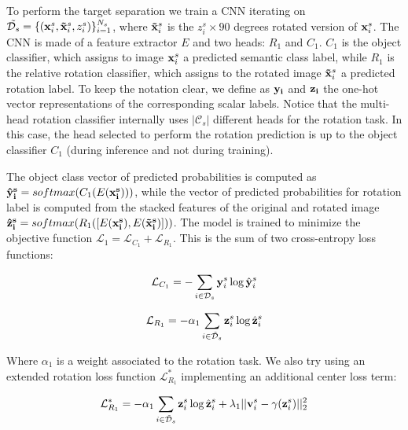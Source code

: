 \documentclass[10pt,twocolumn,letterpaper]{article}
\begin{document}
To perform the target separation we train a CNN iterating on $\tilde{\mathcal{D}_s} = \{({\bf x}_i^s, {\bf \tilde x}_i^s, z_i^s)\}_{i=1}^{N_s}$,
where ${\bf \tilde x}_i^s$ is the $z_i^s\times 90$ degrees rotated version of ${\bf x}_i^s$.
The CNN is made of a feature extractor $E$ and two heads: $R_1$ and $C_1$.
$C_1$ is the object classifier, which assigns to image ${\bf x}_i^s$ a predicted semantic class label,
while $R_1$ is the relative rotation classifier, which assigns to the rotated image ${\bf \tilde x}_i^s$ a predicted rotation label.
To keep the notation clear, we define as ${\bf y_i}$ and ${\bf z_i}$ the one-hot vector representations of the corresponding scalar labels.
Notice that the multi-head rotation classifier internally uses $|\mathcal{C}_s|$ different heads for the rotation task.
In this case, the head selected to perform the rotation prediction is up to the object classifier $C_1$ (during inference and not during training). 

The object class vector of predicted probabilities is computed as ${\bf \hat{y}_i^s} = softmax(C_1(E({\bf x_i^s})))$, while the vector of predicted probabilities
for rotation label is computed from the stacked features of the original and rotated image ${\bf \hat{z}_i^s} = softmax(R_1([E({\bf x_i^s}), E({\bf \tilde{x}_i^s})]))$.
The model is trained to minimize the objective function $\mathcal{L}_1 = \mathcal{L}_{C_1} + \mathcal{L}_{R_1}$.
This is the sum of two cross-entropy loss functions:

\begin{equation}
  \mathcal{L}_{C_1} = -\sum_{i\in\mathcal{D}_s} {\bf y}_i^s \log \hat{\bf y}_i^s
  \label{eq:baseloss_class}
\end{equation}

\begin{equation}
  \mathcal{L}_{R_1} = -\alpha_1\sum_{i\in\mathcal{\tilde{D}}_s} {\bf z}_i^s \log \hat{{\bf z}}_i^s
  \label{eq:baseloss_rot}
\end{equation}

Where $\alpha_1$ is a weight associated to the rotation task.
We also try using an extended rotation loss function $\mathcal{L}_{R_1}^*$ implementing an additional center loss\cite{CenterLoss} term:

\begin{equation}
  \mathcal{L}_{R_1}^* = -\alpha_1\sum_{i\in\mathcal{\tilde{D}}_s} {\bf z}_i^s \log \hat{{\bf z}}_i^s+\lambda_1||{\bf v}_i^s-\gamma({\bf z}_i^s)||_2^2
  \label{eq:center_loss}
\end{equation}
\end{document}
